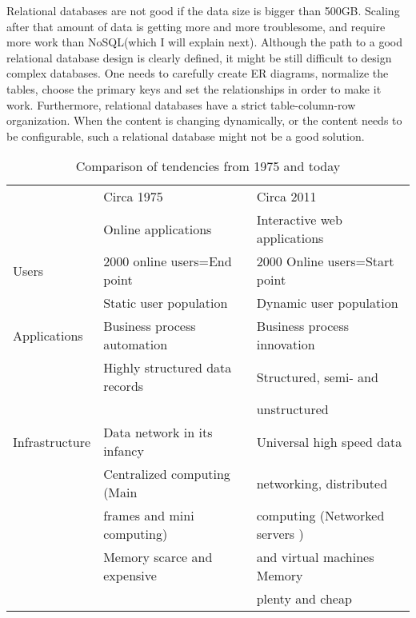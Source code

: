 \documentclass{article}
\begin{document}
Relational databases are not good if the data size is bigger than 500GB. Scaling after that amount of data is getting more and more troublesome, and require more work than NoSQL(which I will explain next). Although the path to a good relational database design is clearly defined, it might be still difficult to design complex databases. One needs to carefully create ER diagrams, normalize the tables, choose the primary keys and set the relationships in order to make it work. Furthermore, relational databases have a strict table-column-row organization. When the content is changing dynamically, or the content needs to be configurable, such a relational database might not be a good solution.

\begin{table}[h]
\centering
\begin{tabular}{| l | l | l |}
\hline
				&	Circa 1975						&	Circa 2011	    					\\
				&	Online applications				&	Interactive web applications		\\
\hline \hline
Users 			&	2000 online users=End point		&	2000 Online users=Start point		\\
				&	Static user population			&	Dynamic user population				\\
\hline
Applications 	&	Business process automation		&	Business process innovation			\\
				&	Highly structured data records	&	Structured, semi- and 				\\
				&									&	unstructured						\\
\hline
Infrastructure 	&	Data network in its infancy		&	Universal high speed data 			\\
				&	Centralized computing (Main		&	networking, distributed  			\\
				&		frames and mini computing)	&	computing (Networked servers )		\\				
				& 	Memory scarce and expensive		&	and virtual machines Memory  		\\
				& 	                         		&	plenty and cheap					\\
\hline 
\end{tabular}
	\caption{Comparison of tendencies from 1975 and today}
	\label{tab:nowandthen}
\end{table}
\end{document}
